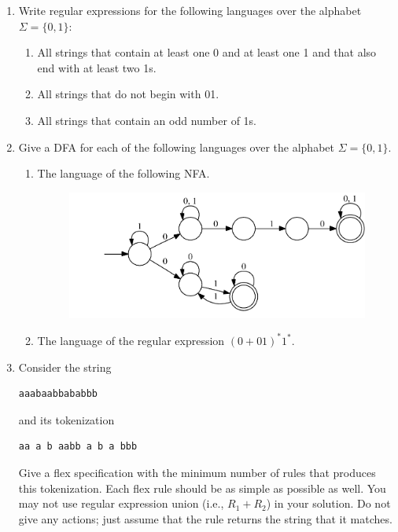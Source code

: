 \documentclass[11pt]{article}
\begin{document}
\begin{enumerate}
\item
Write regular expressions for the following languages over the
alphabet $\Sigma = \{0, 1\}$:
\begin{enumerate}
\item All strings that contain at least one 0 and at least one 1 and
that also end with at least two 1s.
\item All strings that do not begin with 01.
\item All strings that contain an odd number of 1s.
\end{enumerate}

\item
Give a DFA for each of the following languages over the alphabet
$\Sigma = \{0, 1\}$.
\begin{enumerate}
\item The language of the following NFA.
\begin{figure}[htb]
\begin{center}
\includegraphics[scale=0.7]{substr-odd.pdf}
\end{center}
\end{figure}

\item The language of the regular expression $(0 + 01)^{*}1^{*}$.
\end{enumerate}

\item
Consider the string
\begin{verbatim}
aaabaabbababbb
\end{verbatim}
and its tokenization
\begin{verbatim}
aa a b aabb a b a bbb
\end{verbatim}

Give a flex specification with the minimum number of rules that
produces this tokenization.  Each flex rule should be as simple as
possible as well.  You may not use regular expression union (i.e.,
$R_1 + R_2$) in your solution.  Do not give any actions; just assume
that the rule returns the string that it matches.

\end{enumerate}
\end{document}
